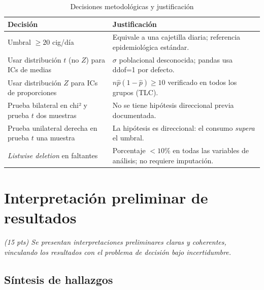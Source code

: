 \documentclass[11pt,a4paper]{article}
\newcommand{\guia}[1]{{\small\itshape\color{gris}#1}\par\vspace{0.15em}}
\begin{document}
\begin{table}[H]
\centering
\caption{Decisiones metodológicas y justificación}
\label{tab:decisiones}
\vspace{0.3em}
\begin{tabular}{p{4.5cm}p{9cm}}
\toprule
\textbf{Decisión} & \textbf{Justificación} \\
\midrule
Umbral $\geq 20$ cig/día & Equivale a una cajetilla diaria; referencia epidemiológica estándar. \\
\addlinespace
Usar distribución $t$ (no $Z$) para ICs de medias & $\sigma$ poblacional desconocida; pandas usa ddof=1 por defecto. \\
\addlinespace
Usar distribución $Z$ para ICs de proporciones & $n\hat{p}(1-\hat{p}) \geq 10$ verificado en todos los grupos (TLC). \\
\addlinespace
Prueba bilateral en chi² y prueba $t$ dos muestras & No se tiene hipótesis direccional previa documentada. \\
\addlinespace
Prueba unilateral derecha en prueba $t$ una muestra & La hipótesis es direccional: el consumo \emph{supera} el umbral. \\
\addlinespace
\textit{Listwise deletion} en faltantes & Porcentaje $<10\%$ en todas las variables de análisis; no requiere imputación. \\
\bottomrule
\end{tabular}
\end{table}

\section{Interpretación preliminar de resultados}
\label{sec:interpretacion}

\guia{(15 pts) Se presentan interpretaciones preliminares claras y coherentes,
vinculando los resultados con el problema de decisión bajo incertidumbre.}

\subsection{Síntesis de hallazgos}
\end{document}
